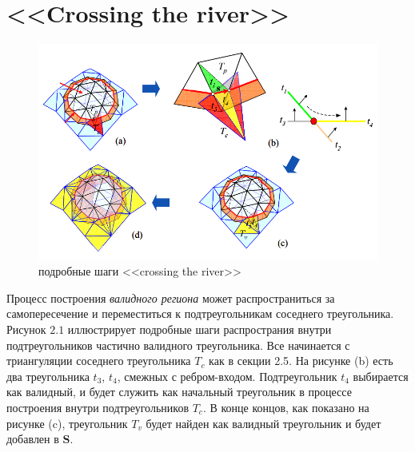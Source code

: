 \section{<<Crossing the river>>}

\begin{figure}[h]
  \label{fig:cross}
  \includegraphics[width=0.7\linewidth]{36.png}
  \centering
  \caption{подробные шаги <<crossing the river>>}
\end{figure}

Процесс построения \textit{валидного региона} может распространиться за самопересечение и переместиться к подтреугольникам соседнего треугольника. Рисунок $2.1$ иллюстрирует подробные шаги распространия внутри подтреугольников частично валидного треугольника. Все начинается с триангуляции соседнего треугольника $T_c$ как в секции 2.5. На рисунке (b) есть два треугольника $t_3$, $t_4$, смежных с ребром-входом. Подтреугольник $t_4$ выбирается как валидный, и будет служить как начальный треугольник в процессе построения внутри подтреугольников $T_c$. В конце концов, как показано на рисунке (c), треугольник $T_v$ будет найден как валидный треугольник и будет добавлен в $\mathbf{S}$.


